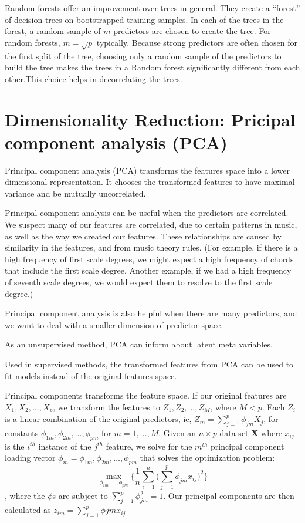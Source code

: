 \documentclass[12pt,twoside]{reedthesis}
\theoremstyle{definition}
\theoremstyle{definition}
\theoremstyle{definition}
\theoremstyle{remark}
\begin{document}
Random forests offer an improvement over trees in general. They create a
``forest'' of decision trees on bootstrapped training samples. In each
of the trees in the forest, a random sample of \(m\) predictors are
chosen to create the tree. For random forests, \(m = \sqrt{p}\)
typically. Because strong predictors are often chosen for the first
split of the tree, choosing only a random sample of the predictors to
build the tree makes the trees in a Random forest significantly
different from each other.This choice helps in decorrelating the trees.

\section{Dimensionality Reduction: Pricipal component analysis
(PCA)}\label{dimensionality-reduction-pricipal-component-analysis-pca}

Principal component analysis (PCA) transforms the features space into a
lower dimensional representation. It chooses the transformed features to
have maximal variance and be mutually uncorrelated.

Principal component analysis can be useful when the predictors are
correlated. We suspect many of our features are correlated, due to
certain patterns in music, as well as the way we created our features.
These relationships are caused by similarity in the features, and from
music theory rules. (For example, if there is a high frequency of first
scale degrees, we might expect a high frequency of chords that include
the first scale degree. Another example, if we had a high frequency of
seventh scale degrees, we would expect them to resolve to the first
scale degree.)

Principal component analysis is also helpful when there are many
predictors, and we want to deal with a smaller dimension of predictor
space.

As an unsupervised method, PCA can inform about latent meta variables.

Used in supervised methods, the transformed features from PCA can be
used to fit models instead of the original features space.

Principal components transforms the feature space. If our original
features are \(X_1,X_2,\ldots,X_p\), we transform the features to
\(Z_1,Z_2,\ldots,Z_M\), where \(M < p\). Each \(Z_i\) is a linear
combination of the original predictors, ie,
\(Z_m = \sum_{j = 1}^p \phi_{jm}X_j\), for constants
\(\phi_{1m},\phi_{2m},\ldots,\phi_{pm}\) for \(m = 1,\ldots,M\). Given
an \(n\times p\) data set \(\mathbf{X}\) where \(x_{ij}\) is the
\(i^{th}\) instance of the \(j^{th}\) feature, we solve for the
\(m^{th}\) principal component loading vector
\(\phi_m = \phi_{1m},\phi_{2m},\ldots,\phi_{pm}\) that solves the
optimization problem:
\[\max_{\phi_{1m},\ldots,\phi_{pm}} \bigg\{\frac{1}{n}\sum_{i=1}^n\bigg(\sum_{j=1}^p \phi_{jm}x_{ij}\bigg)^2\bigg\}\],
where the \(\phi\)s are subject to \(\sum_{j = 1}^p\phi_{jm}^2 = 1\).
Our principal components are then calculated as
\(z_{im} = \sum_{j = 1}^p\phi{jm}x_{ij}\)
\end{document}
